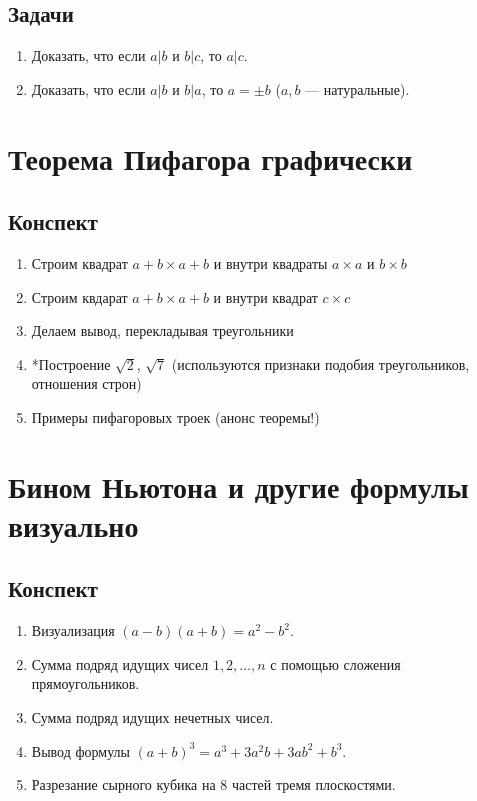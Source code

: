 \subsection*{Задачи}
\begin{enumerate}
\item Доказать, что если $a|b$ и $b|c$, то $a|c$.
\item Доказать, что если $a|b$ и $b|a$, то $a=\pm b$ ($a,b$ --- натуральные).
\end{enumerate}


\section{Теорема Пифагора графически}

\subsection*{Конспект}
\begin{enumerate}
\item Строим квадрат $a+b\times a+b$ и внутри квадраты $a\times a$ и $b\times b$
\item Строим квдарат $a+b\times a+b$ и внутри квадрат $c\times c$
\item Делаем вывод, перекладывая треугольники
\item *Построение $\sqrt 2$, $\sqrt 7$ (используются признаки подобия треугольников, отношения строн)
\item Примеры пифагоровых троек (анонс теоремы!)
\end{enumerate}

\section{Бином Ньютона и другие формулы визуально}

\subsection*{Конспект}
\begin{enumerate}\setlength{\itemsep}{1pt}
\item Визуализация $(a-b)(a+b)=a^2-b^2$.
\item Сумма подряд идущих чисел $1,2,\dots,n$ с помощью сложения прямоугольников.
\item Сумма подряд идущих нечетных чисел.
\item Вывод формулы $(a+b)^3 = a^3+3a^2b+3ab^2+b^3$.
\item Разрезание сырного кубика на 8 частей тремя плоскостями.
\end{enumerate}
